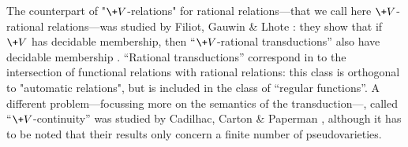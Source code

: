 The counterpart of "$\+V$-relations" for rational relations---that we call here $\+V$-rational relations---was studied by Filiot, Gauwin \& Lhote \cite{Filiot2019Logical}: they show that if
$\+V$ has decidable membership, then ``$\+V$-rational transductions'' also have decidable membership
\cite[Theorem 4.10, p.~26]{Filiot2019Logical}.
``Rational transductions'' correspond in  to the intersection of functional relations with rational relations: this class
is orthogonal to "automatic relations",
but is included in the class of ``regular functions''.
A different problem---focussing more on the semantics of the transduction---, called ``$\+V$-continuity'' was studied by Cadilhac, Carton \& Paperman \cite[Theorem 1.3, p.~3]{Cadilhac2020Continuity}, although it has to be noted that their results only concern
a finite number of pseudovarieties.